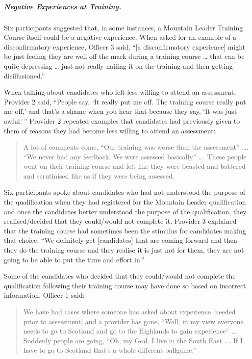 \documentclass[
  12pt,
  a4paper,
]{book}
\begin{document}
\hypertarget{qual-neg-exp-train}{%
\subparagraph{Negative Experiences at Training.}\label{qual-neg-exp-train}}

Six participants suggested that, in some instances, a Mountain Leader Training Course itself could be a negative experience. When asked for an example of a disconfirmatory experience, Officer 3 said, ``{[}a disconfirmatory experience{]} might be just feeling they are well off the mark during a training course \ldots{} that can be quite depressing \ldots{} just not really nailing it on the training and then getting disillusioned.''

When talking about candidates who felt less willing to attend an assessment, Provider 2 said, ``People say, `It really put me off. The training course really put me off,' and that's a shame when you hear that because they say, `It was just awful.'\,'' Provider 2 repeated examples that candidates had previously given to them of reasons they had become less willing to attend an assessment:

\begin{quote}
A lot of comments come, ``Our training was worse than the assessment'' \ldots. ``We never had any feedback. We were assessed basically'' \ldots. These people went on their training course and felt like they were beasted and battered and scrutinised like as if they were being assessed.
\end{quote}

Six participants spoke about candidates who had not understood the purpose of the qualification when they had registered for the Mountain Leader qualification and once the candidates better understood the purpose of the qualification, they realised/decided that they could/would not complete it. Provider 3 explained that the training course had sometimes been the stimulus for candidates making that choice, ``We definitely get {[}candidates{]} that are coming forward and then they do the training course and they realise it is just not for them, they are not going to be able to put the time and effort in.''

Some of the candidates who decided that they could/would not complete the qualification following their training course may have done so based on incorrect information. Officer 1 said:

\begin{quote}
We have had cases where someone has asked about experience {[}needed prior to assessment{]} and a provider has gone, ``Well, in my view everyone needs to go to Scotland and go to the Highlands to gain experience'' \ldots. Suddenly people are going, ``Oh, my God. I live in the South East \ldots. If I have to go to Scotland that's a whole different ballgame.''
\end{quote}
\end{document}
